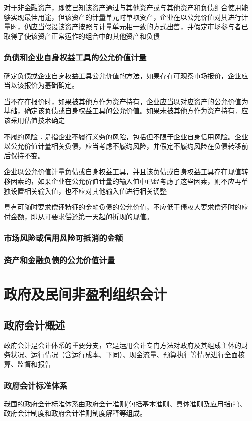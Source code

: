 \documentclass[UTF8,12pt]{ctexart}
\numberwithin{equation}{section} %
\numberwithin{figure}{section}
\numberwithin{table}{section}
\begin{document}
	对于非金融资产，即使已知该资产通过与其他资产或与其他资产和负债组合使用能够实现最佳用途，但该资产的计量单元时单项资产，企业在以公允价值对其进行计量时，仍应当假设该资产按照与计量单元相一致的方式出售，并假定市场参与者已取得了使该资产正常运作的组合中的其他资产和负债
	
	\subsubsection{负债和企业自身权益工具的公允价值计量}
	确定负债或企业自身权益工具公允价值的方法，如果存在可观察市场报价，企业应当以该报价为基础确定。
	
	当不存在报价时，如果被其他方作为资产持有，企业应当以对应资产的公允价值为基础，确定该负债或自身权益工具的公允价值。如果未被其他方作为资产持有，应该采用估值技术确定
	
	不履约风险：是指企业不履行义务的风险，包括但不限于企业自身信用风险。企业以公允价值计量相关负债，应当考虑不履约风险，并假定不履约风险在负债转移前后保持不变。
	
	企业以公允价值计量负债或自身权益工具，并且该负债或自身权益工具存在现值转移因素的，如果企业在公允价值计量的输入值中已经考虑了这些因素，则不应再单独设置相关输入值，也不应对其他输入值进行相关调整
	
	具有可随时要求偿还特征的金融负债的公允价值，不应低于债权人要求偿还时的应付金额，即从可要求偿还第一天起的折现的现值。
	\subsubsection{市场风险或信用风险可抵消的金额}
	\subsubsection{资产和金融负债的公允价值计量}
	
	\newpage
	
	\section{政府及民间非盈利组织会计}
	\subsection{政府会计概述}
	政府会计是会计体系的重要分支，它是运用会计专门方法对政府及其组成主体的财务状况、运行情况（含运行成本、下同）、现金流量、预算执行等情况进行全面核算、监督和报告
	\subsubsection{政府会计标准体系}
	我国的政府会计标准体系由政府会计准则(包括基本准则、具体准则及应用指南)、政府会计制度和政府会计准则制度解释等组成。
\end{document}
